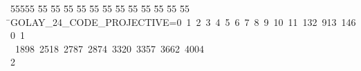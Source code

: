 %
%
\begin{tabbing}
55555 \= 55 \= 55 \= 55 \= 55 \= 55 \= 55 \= 55 \= 55 \= 55 \= 55 \= 55 \= 55 \= \>GOLAY\_24\_CODE\_PROJECTIVE=0\ 1\ 2\ 3\ 4\ 5\ 6\ 7\ 8\ 9\ 10\ 11\ 132\ 913\ 1460\ 1\\[0pt]
\ 1898\ 2518\ 2787\ 2874\ 3320\ 3357\ 3662\ 4004\\[0pt]
2\>\end{tabbing}
